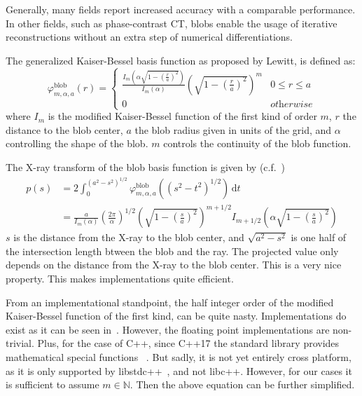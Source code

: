 Generally, many fields report increased accuracy with a comparable performance. In other fields,
such as phase-contrast CT, blobs enable the usage of iterative reconstructions without an extra step
of numerical differentiations.

The generalized Kaiser-Bessel basis function as proposed by Lewitt, is defined as:
\begin{equation}\label{eq:blob_basis_fn}
	\varphi^{\text{blob}}_{m, \alpha, a}(r) =
	\begin{cases}
		\frac{I_m\left( \alpha \sqrt{1 - \left(\frac{r}{a}\right)^2} \right)} {I_m\left( \alpha \right)} \left( \sqrt{1 - \left(\frac{r}{a}\right)^2}\right)^m & 0 \le r \le a      \\
		0                                                                                                                                                      & \textit{otherwise}
	\end{cases}
\end{equation}
where \(I_m\) is the modified Kaiser-Bessel function of the first kind of order \(m\), \(r\) the
distance to the blob center, \(a\) the blob radius given in units of the grid, and \(\alpha\)
controlling the shape of the blob. \(m\) controls the continuity of the blob function.

The X-ray transform of the blob basis function is given by
(c.f.~\cite{lewitt_multidimensional_1990,lewitt_alternatives_1992})
\begin{align}\label{eq:radon_blob_basis}
	p(s) & = 2 \int_0^{(a^2-s^2)^{1 / 2}} \varphi^{\text{blob}}_{m, \alpha, a}\left(\left(s^2 - t^2\right)^{1/2}\right) \, \mathrm{d} t                                                                        \\
	     & = \frac{a}{I_m(\alpha)} \left( \frac{2\pi}{\alpha}\right)^{1/2} \left( \sqrt{1 - \left(\frac{s}{a}\right)^2} \right)^{m + 1/2} I_{m+1/2}\left( \alpha \sqrt{1 - \left(\frac{s}{a}\right)^2} \right)
\end{align}
\(s\) is the distance from the X-ray to the blob center, and \(\sqrt{a^2 - s^2}\) is one half of the
intersection length btween the blob and the ray. The projected value only depends on the distance
from the X-ray to the blob center. This is a very nice property. This makes implementations quite
efficient.


From an implementational standpoint, the half integer order of the modified Kaiser-Bessel function
of the first kind, can be quite nasty. Implementations do exist as it can be seen
in~\cite{temme_numerical_1975}. However, the floating point implementations are non-trivial. Plus,
for the case of C++, since C++17 the standard library provides mathematical special functions
~\cite{noauthor_c_nodate, noauthor_stdcyl_bessel_i_nodate}. But sadly, it is not yet entirely
cross platform, as it is only supported by libstdc++~\cite{noauthor_libstdc_nodate-1}, and not
libc++. However, for our cases it is sufficient to assume \(m \in \mathbb{N}\). Then the above
equation can be further simplified.

